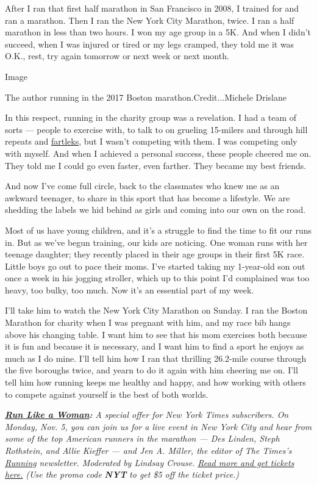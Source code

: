 After I ran that first half marathon in San Francisco in 2008, I trained
for and ran a marathon. Then I ran the New York City Marathon, twice. I
ran a half marathon in less than two hours. I won my age group in a 5K.
And when I didn't succeed, when I was injured or tired or my legs
cramped, they told me it was O.K., rest, try again tomorrow or next week
or next month.

Image

The author running in the 2017 Boston marathon.Credit...Michele Drislane

In this respect, running in the charity group was a revelation. I had a
team of sorts --- people to exercise with, to talk to on grueling
15-milers and through hill repeats and
\href{https://www.runnersworld.com/advanced/a20816077/finding-fartlek/}{fartleks},
but I wasn't competing with them. I was competing only with myself. And
when I achieved a personal success, these people cheered me on. They
told me I could go even faster, even farther. They became my best
friends.

And now I've come full circle, back to the classmates who knew me as an
awkward teenager, to share in this sport that has become a lifestyle. We
are shedding the labels we hid behind as girls and coming into our own
on the road.

Most of us have young children, and it's a struggle to find the time to
fit our runs in. But as we've begun training, our kids are noticing. One
woman runs with her teenage daughter; they recently placed in their age
groups in their first 5K race. Little boys go out to pace their moms.
I've started taking my 1-year-old son out once a week in his jogging
stroller, which up to this point I'd complained was too heavy, too
bulky, too much. Now it's an essential part of my week.

I'll take him to watch the New York City Marathon on Sunday. I ran the
Boston Marathon for charity when I was pregnant with him, and my race
bib hangs above his changing table. I want him to see that his mom
exercises both because it is fun and because it is necessary, and I want
him to find a sport he enjoys as much as I do mine. I'll tell him how I
ran that thrilling 26.2-mile course through the five boroughs twice, and
yearn to do it again with him cheering me on. I'll tell him how running
keeps me healthy and happy, and how working with others to compete
against yourself is the best of both worlds.

\textbf{\href{https://timesevents.nytimes.com/nytrunning}{\emph{Run Like
a Woman}}\emph{:}} \emph{A special offer for New York Times subscribers.
On Monday, Nov. 5, you can join us for a live event in New York City and
hear from some of the top American runners in the marathon --- Des
Linden, Steph Rothstein, and Allie Kieffer --- and Jen A. Miller, the
editor of The Times's}
\href{https://www.nytimes.com/newsletters/running?module=inline}{\emph{Running}}
\emph{newsletter. Moderated by Lindsay Crouse.}
\href{https://timesevents.nytimes.com/nytrunning}{\emph{Read more and
get tickets here.}} \emph{(Use the promo code} \emph{\textbf{NYT}}
\emph{to get \$5 off the ticket price.)}

